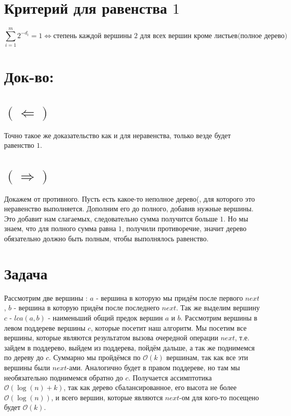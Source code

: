 \documentclass{article}
\begin{document}
\section*{Критерий для равенства $1$}
$$\sum_{i = 1}^{m}2^{-d_{i}} = 1 \Leftrightarrow \mbox{степень каждой вершины 2 для всех вершин кроме листьев(полное дерево)}$$
\section*{Док-во:}
\section*{$(\Leftarrow)$}
Точно такое же доказательство как и для неравенства, только везде будет равенство $1$.
\section*{$(\Rightarrow)$}
Докажем от противного. Пусть есть какое-то неполное дерево(, для которого это неравенство выполняется. Дополним его до полного, добавив нужные вершины. Это добавит нам слагаемых, следовательно сумма получится больше $1$. Но мы знаем, что для полного сумма равна $1$, получили противоречие, значит дерево обязательно должно быть полным, чтобы выполнялось равенство.
\section*{Задача }
Рассмотрим две вершины : $a$ - вершина в которую мы придём после первого $next$, $b$ - вершина в которую придём после последнего $next$. Так же выделим вершину $c$ - $lca(a, b)$ - наименьший общий предок вершин $a$ и $b$.
\newline
Рассмотрим вершины в левом поддереве вершины $c$, которые посетит наш алгоритм. Мы посетим все вершины, которые являются результатом вызова очередной операции $next$, т.е. зайдем в поддерево, выйдем из поддерева, пойдём дальше, а так же поднимемся по дереву до $c$. Суммарно мы пройдёмся по $\mathcal{O}(k)$ вершинам, так как все эти вершины были $next$-ами. Аналогично будет в правом поддереве, но там мы необязательно поднимемся обратно до $c$.
\newline
Получается ассимптотика $\mathcal{O}(\log(n) + k)$, так как дерево сбалансированное, его высота не более $\mathcal{O}(\log(n))$, и всего вершин, которые являются $next$-ом для кого-то посещено будет $\mathcal{O}(k)$.
\end{document}
